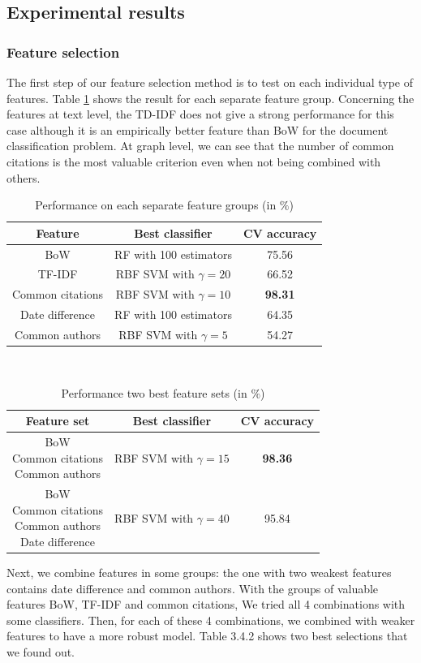 \documentclass{article}
\begin{document}
\subsection{Experimental results}
\label{sec:result}
\subsubsection{Feature selection}
The first step of our feature selection method is to test on each individual type of features. Table \ref{tab:separate} shows the result for each separate feature group. Concerning the features at text level, the TD-IDF does not give a strong performance for this case although it is an empirically better feature than BoW for the document classification problem. At graph level, we can see that the number of common citations is the most valuable criterion even when not being combined with others. 
\begin{table}[t]
	\label{tab:separate}
	\centering
	\caption{Performance on each separate feature groups (in $\%$)}
	\begin{tabular}{|c|c|c|} \hline
		Feature&Best classifier&CV accuracy\\ \hline
		BoW&RF with 100 estimators&75.56\\ \hline
		TF-IDF&RBF SVM with $\gamma=20$&66.52\\ \hline
		Common citations&RBF SVM with $\gamma=10$&\textbf{98.31}\\ \hline
		Date difference&RF with 100 estimators&64.35\\ \hline
		Common authors&RBF SVM with $\gamma=5$&54.27\\ \hline
	\end{tabular}
\end{table}\\
\begin{table}[t]
	\label{tab:combination}
	\centering
	\caption{Performance two best feature sets (in $\%$)}
	\begin{tabular}{|c|c|c|} \hline
		Feature set&Best classifier&CV accuracy\\ \hline
		\pbox{20cm}{BoW\\Common citations\\Common authors}&RBF SVM with $\gamma=15$&\textbf{98.36}\\ \hline
		\pbox{20cm}{BoW\\Common citations\\Common authors\\Date difference}&RBF SVM with $\gamma=40$&95.84\\ \hline
	\end{tabular}
\end{table}
Next, we combine features in some groups: the one with two weakest features contains date difference and common authors. With the groups of valuable features BoW, TF-IDF and common citations, We tried all 4 combinations with some classifiers. Then, for each of these 4 combinations, we combined with weaker features to have a more robust model. Table 3.4.2 shows two best selections that we found out.
\end{document}
